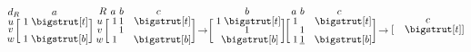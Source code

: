 \documentclass[sn-mathphys]{sn-jnl}
\begin{document}
$$
	\def\rowsp{0.4em}
	\def\arraystretch{0.60}
	\makeatletter\setlength\BA@colsep{0.9pt}\makeatother
	\begin{blockarray}{cc}{d_R}
	\kern-0.2em & a \\
		\begin{block}{c[c]}
  		u \kern \rowsp & \; 1 \; \topstrut \\
  		v \kern \rowsp & \;  \; \\
  		w \kern \rowsp & \; 1 \; \botstrut \\
		\end{block}
	\end{blockarray}
	\; \;
	\begin{blockarray}{cccc}{R}
	 \kern-0.2em & a & b & c  \\
		\begin{block}{c[ccc]}
  		u \kern \rowsp & \; 1 & 1 &  \hphantom{1} \; \topstrut \\
  		v \kern \rowsp & \;  & 1 &  \hphantom{1} \; \\
  		w \kern \rowsp & \; 1 &  &  \hphantom{1} \; \botstrut \\
		\end{block}
	\end{blockarray}
\; \to
\begin{blockarray}{cc}{}
	\kern-0.2em & b \\
		\begin{block}{c[c]}
  		  & \; 1 \; \topstrut \\
  		 & \;  1 \; \\
  		 & \; \; \botstrut \\
		\end{block}
	\end{blockarray}
	\; \;
\begin{blockarray}{cccc}{}
	\kern-0.2em & a & b & c  \\
		\begin{block}{c[ccc]}
  		  & \; 1 &    &  \hphantom{1} \; \topstrut \\
  		  & \;    & 1 &  \hphantom{1} \; \\
  		 & \; 1 & \underline{1} &  \hphantom{1} \; \botstrut \\
		\end{block}
	\end{blockarray}
\; \to
	\begin{blockarray}{cc}{}
	\kern-0.2em & c \\
		\begin{block}{c[c]}
  		  & \; \hphantom{1} \; \topstrut \\

\end{block}
\end{blockarray}$$
\end{document}
